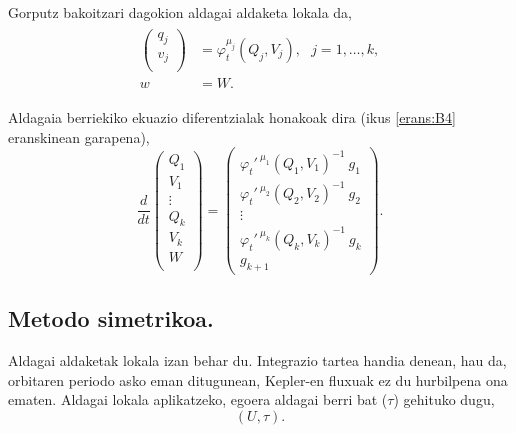Gorputz bakoitzari dagokion aldagai aldaketa lokala da,
\begin{align}
\label{eq:aldfl2}
\begin{split}
\left(\begin{array}{c}
                q_j  \\
                v_j  \\
\end{array}\right)&= \varphi_t^{\mu_j}(Q_j,V_j), \ \ \ j=1,\dots,k, \\
w&=W.
\end{split}
\end{align}

Aldagaia berriekiko ekuazio diferentzialak honakoak dira (ikus \ref{erans:B4} eranskinean garapena),
\begin{equation*}
\frac{d}{dt}
\left(\begin{array}{c}
                Q_1  \\
                V_1  \\
                \vdots \\
                Q_k    \\
                V_k    \\
                W      \\
\end{array}\right)=
\left(\begin{array}{c}
               \varphi_t'^{\ \mu_1}(Q_1,V_1)^{-1} \ g_1 \\ 
               \varphi_t'^{\ \mu_2}(Q_2,V_2)^{-1} \ g_2 \\
               \vdots \\
               \varphi_t'^{\ \mu_k}(Q_k,V_k)^{-1} \ g_k \\
               g_{k+1}
\end{array}\right).
\end{equation*}



\subsection*{Metodo simetrikoa.}


Aldagai aldaketak lokala izan behar du. Integrazio tartea handia denean, hau da, orbitaren periodo asko eman ditugunean, Kepler-en fluxuak ez du hurbilpena ona ematen. Aldagai lokala aplikatzeko, egoera aldagai berri bat ($\tau$) gehituko dugu, 
\begin{equation}
(U,\tau).
\end{equation}



